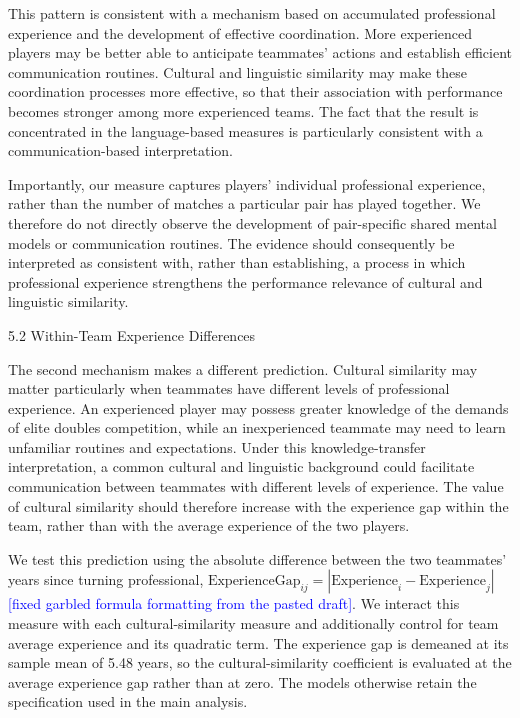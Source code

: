 \documentclass[10pt]{article}
\begin{document}
This pattern is consistent with a mechanism based on accumulated professional experience and the development of effective coordination. More experienced players may be better able to anticipate teammates' actions and establish efficient communication routines. Cultural and linguistic similarity may make these coordination processes more effective, so that their association with performance becomes stronger among more experienced teams. The fact that the result is concentrated in the language-based measures is particularly consistent with a communication-based interpretation.

Importantly, our measure captures players' individual professional experience, rather than the number of matches a particular pair has played together. We therefore do not directly observe the development of pair-specific shared mental models or communication routines. The evidence should consequently be interpreted as consistent with, rather than establishing, a process in which professional experience strengthens the performance relevance of cultural and linguistic similarity.

5.2 Within-Team Experience Differences

The second mechanism makes a different prediction. Cultural similarity may matter particularly when teammates have different levels of professional experience. An experienced player may possess greater knowledge of the demands of elite doubles competition, while an inexperienced teammate may need to learn unfamiliar routines and expectations. Under this knowledge-transfer interpretation, a common cultural and linguistic background could facilitate communication between teammates with different levels of experience. The value of cultural similarity should therefore increase with the experience gap within the team, rather than with the average experience of the two players.

We test this prediction using the absolute difference between the two teammates' years since turning professional, $\text{ExperienceGap}_{ij} = |\text{Experience}_i - \text{Experience}_j|$\textcolor{blue}{[fixed garbled formula formatting from the pasted draft]}. We interact this measure with each cultural-similarity measure and additionally control for team average experience and its quadratic term. The experience gap is demeaned at its sample mean of 5.48 years, so the cultural-similarity coefficient is evaluated at the average experience gap rather than at zero. The models otherwise retain the specification used in the main analysis.
\end{document}
